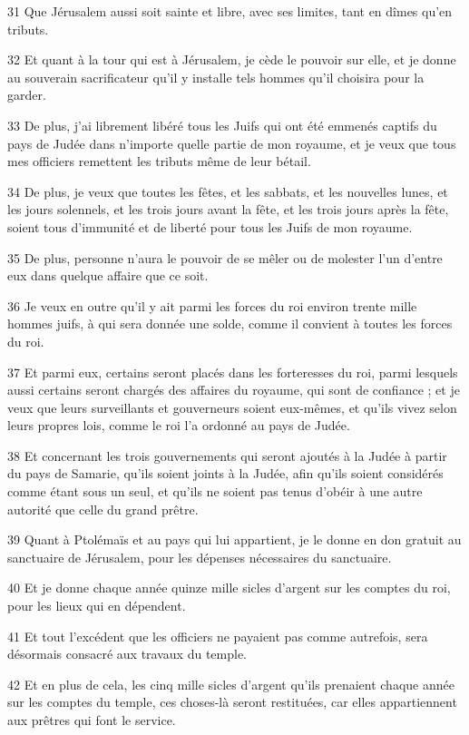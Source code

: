 \par 31 Que Jérusalem aussi soit sainte et libre, avec ses limites, tant en dîmes qu'en tributs.
\par 32 Et quant à la tour qui est à Jérusalem, je cède le pouvoir sur elle, et je donne au souverain sacrificateur qu'il y installe tels hommes qu'il choisira pour la garder.
\par 33 De plus, j'ai librement libéré tous les Juifs qui ont été emmenés captifs du pays de Judée dans n'importe quelle partie de mon royaume, et je veux que tous mes officiers remettent les tributs même de leur bétail.
\par 34 De plus, je veux que toutes les fêtes, et les sabbats, et les nouvelles lunes, et les jours solennels, et les trois jours avant la fête, et les trois jours après la fête, soient tous d'immunité et de liberté pour tous les Juifs de mon royaume.
\par 35 De plus, personne n'aura le pouvoir de se mêler ou de molester l'un d'entre eux dans quelque affaire que ce soit.
\par 36 Je veux en outre qu'il y ait parmi les forces du roi environ trente mille hommes juifs, à qui sera donnée une solde, comme il convient à toutes les forces du roi.
\par 37 Et parmi eux, certains seront placés dans les forteresses du roi, parmi lesquels aussi certains seront chargés des affaires du royaume, qui sont de confiance ; et je veux que leurs surveillants et gouverneurs soient eux-mêmes, et qu'ils vivez selon leurs propres lois, comme le roi l'a ordonné au pays de Judée.
\par 38 Et concernant les trois gouvernements qui seront ajoutés à la Judée à partir du pays de Samarie, qu'ils soient joints à la Judée, afin qu'ils soient considérés comme étant sous un seul, et qu'ils ne soient pas tenus d'obéir à une autre autorité que celle du grand prêtre.
\par 39 Quant à Ptolémaïs et au pays qui lui appartient, je le donne en don gratuit au sanctuaire de Jérusalem, pour les dépenses nécessaires du sanctuaire.
\par 40 Et je donne chaque année quinze mille sicles d'argent sur les comptes du roi, pour les lieux qui en dépendent.
\par 41 Et tout l'excédent que les officiers ne payaient pas comme autrefois, sera désormais consacré aux travaux du temple.
\par 42 Et en plus de cela, les cinq mille sicles d'argent qu'ils prenaient chaque année sur les comptes du temple, ces choses-là seront restituées, car elles appartiennent aux prêtres qui font le service.
